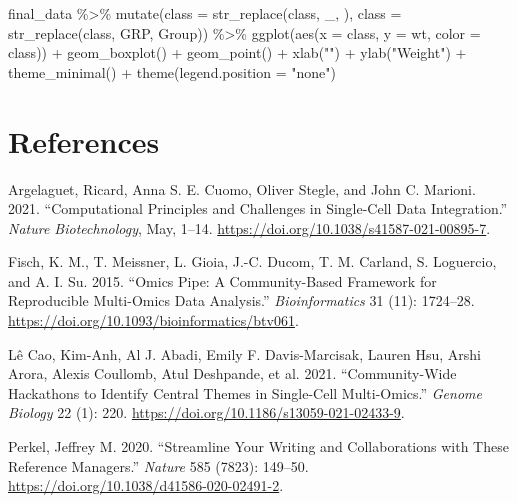 \documentclass[smallextended]{svjour3}       %
\newenvironment{Shaded}{\begin{snugshade}}{\end{snugshade}}
\newcommand{\AttributeTok}[1]{\textcolor[rgb]{0.77,0.63,0.00}{#1}}
\newcommand{\FunctionTok}[1]{\textcolor[rgb]{0.00,0.00,0.00}{#1}}
\newcommand{\NormalTok}[1]{#1}
\newcommand{\SpecialCharTok}[1]{\textcolor[rgb]{0.00,0.00,0.00}{#1}}
\newcommand{\StringTok}[1]{\textcolor[rgb]{0.31,0.60,0.02}{#1}}
\newlength{\cslhangindent}
\newlength{\cslentryspacingunit} %
\newenvironment{CSLReferences}[2] %
 {%
  \setlength{\parindent}{0pt}
  \ifodd #1
  \let\oldpar\par
  \def\par{\hangindent=\cslhangindent\oldpar}
  \fi
  \setlength{\parskip}{#2\cslentryspacingunit}
 }%
 {}
\begin{document}
\begin{Shaded}
\begin{Highlighting}[]
\NormalTok{final\_data }\SpecialCharTok{\%\textgreater{}\%} 
  \FunctionTok{mutate}\NormalTok{(}\AttributeTok{class =} \FunctionTok{str\_replace}\NormalTok{(class, }\StringTok{\textquotesingle{}\_\textquotesingle{}}\NormalTok{, }\StringTok{\textquotesingle{} \textquotesingle{}}\NormalTok{),}
         \AttributeTok{class =} \FunctionTok{str\_replace}\NormalTok{(class, }\StringTok{\textquotesingle{}GRP\textquotesingle{}}\NormalTok{, }\StringTok{\textquotesingle{}Group\textquotesingle{}}\NormalTok{)) }\SpecialCharTok{\%\textgreater{}\%} 
  \FunctionTok{ggplot}\NormalTok{(}\FunctionTok{aes}\NormalTok{(}\AttributeTok{x =}\NormalTok{ class, }\AttributeTok{y =}\NormalTok{ wt, }\AttributeTok{color =}\NormalTok{ class)) }\SpecialCharTok{+}
  \FunctionTok{geom\_boxplot}\NormalTok{() }\SpecialCharTok{+}
  \FunctionTok{geom\_point}\NormalTok{() }\SpecialCharTok{+} 
  \FunctionTok{xlab}\NormalTok{(}\StringTok{""}\NormalTok{) }\SpecialCharTok{+}
  \FunctionTok{ylab}\NormalTok{(}\StringTok{"Weight"}\NormalTok{) }\SpecialCharTok{+} 
  \FunctionTok{theme\_minimal}\NormalTok{() }\SpecialCharTok{+}
  \FunctionTok{theme}\NormalTok{(}\AttributeTok{legend.position =} \StringTok{"none"}\NormalTok{)}
\end{Highlighting}
\end{Shaded}

\hypertarget{references}{%
\section*{References}\label{references}}

\hypertarget{refs}{}
\begin{CSLReferences}{1}{0}
\leavevmode\hypertarget{ref-argelaguet_computational_2021}{}%
Argelaguet, Ricard, Anna S. E. Cuomo, Oliver Stegle, and John C. Marioni. 2021. {``Computational Principles and Challenges in Single-Cell Data Integration.''} \emph{Nature Biotechnology}, May, 1--14. \url{https://doi.org/10.1038/s41587-021-00895-7}.

\leavevmode\hypertarget{ref-fisch_omics_2015}{}%
Fisch, K. M., T. Meissner, L. Gioia, J.-C. Ducom, T. M. Carland, S. Loguercio, and A. I. Su. 2015. {``Omics {Pipe}: A Community-Based Framework for Reproducible Multi-Omics Data Analysis.''} \emph{Bioinformatics} 31 (11): 1724--28. \url{https://doi.org/10.1093/bioinformatics/btv061}.

\leavevmode\hypertarget{ref-le_cao_community-wide_2021}{}%
Lê Cao, Kim-Anh, Al J. Abadi, Emily F. Davis-Marcisak, Lauren Hsu, Arshi Arora, Alexis Coullomb, Atul Deshpande, et al. 2021. {``Community-Wide Hackathons to Identify Central Themes in Single-Cell Multi-Omics.''} \emph{Genome Biology} 22 (1): 220. \url{https://doi.org/10.1186/s13059-021-02433-9}.

\leavevmode\hypertarget{ref-perkel2020}{}%
Perkel, Jeffrey M. 2020. {``Streamline Your Writing {{}} and Collaborations {{}} with These Reference Managers.''} \emph{Nature} 585 (7823): 149--50. \url{https://doi.org/10.1038/d41586-020-02491-2}.

\end{CSLReferences}




\end{document}
